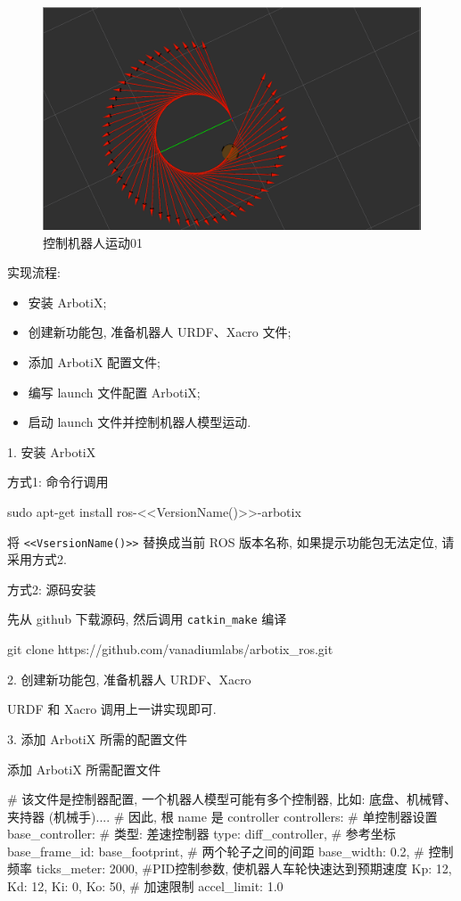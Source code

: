 \documentclass[openany, fontset=windowsold]{ctexbook}
\theoremstyle{kaiti}
\theoremstyle{normal}
\begin{document}
\begin{figure}[!ht]
  \centering
  \includegraphics[width=.7\textwidth]{ros_sim_control_robot_local.png}
  \caption{控制机器人运动01}
  \label{fig:ros_sim_control_robot_local_copy}
\end{figure}

实现流程:

\begin{itemize}
  \item 安装 ArbotiX;
  \item 创建新功能包, 准备机器人 URDF、Xacro 文件;
  \item 添加 ArbotiX 配置文件;
  \item 编写 launch 文件配置 ArbotiX;
  \item 启动 launch 文件并控制机器人模型运动.
\end{itemize}

1. 安装 ArbotiX

方式1: 命令行调用

\begin{bash}
  sudo apt-get install ros-<<VersionName()>>-arbotix
\end{bash}

将 \verb|<<VsersionName()>>| 替换成当前 ROS 版本名称, 如果提示功能包无法定位, 请采用方式2.

方式2: 源码安装

先从 github 下载源码, 然后调用 \verb|catkin_make| 编译

\begin{bash}
  git clone https://github.com/vanadiumlabs/arbotix_ros.git
\end{bash}

2. 创建新功能包, 准备机器人 URDF、Xacro

URDF 和 Xacro 调用上一讲实现即可.

3. 添加 ArbotiX 所需的配置文件

添加 ArbotiX 所需配置文件

\begin{bash}
  # 该文件是控制器配置, 一个机器人模型可能有多个控制器, 比如: 底盘、机械臂、夹持器 (机械手)....
  # 因此, 根 name 是 controller
  controllers: {
    # 单控制器设置
    base_controller: {
            # 类型: 差速控制器
        type: diff_controller,
        # 参考坐标
        base_frame_id: base_footprint, 
        # 两个轮子之间的间距
        base_width: 0.2,
        # 控制频率
        ticks_meter: 2000, 
        #PID控制参数, 使机器人车轮快速达到预期速度
        Kp: 12, 
        Kd: 12, 
        Ki: 0, 
        Ko: 50, 
        # 加速限制
        accel_limit: 1.0 
      }
  }
\end{bash}
\end{document}
